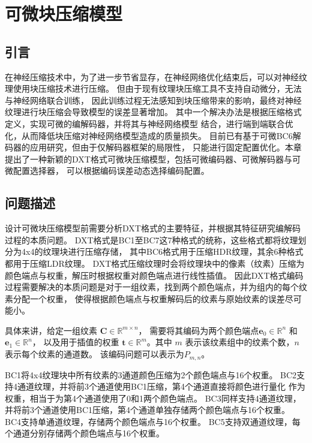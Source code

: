 
\chapter{可微块压缩模型}

\section{引言}

在神经压缩技术中，为了进一步节省显存，在神经网络优化结束后，可以对神经纹理使用块压缩技术进行压缩。
但由于现有纹理块压缩工具不支持自动微分，无法与神经网络联合训练，
因此训练过程无法感知到块压缩带来的影响，最终对神经纹理进行块压缩会导致模型的误差显著增加。
其中一个解决办法是根据压缩格式定义，实现可微的编解码器，并将其与神经网络模型
结合，进行端到端联合优化，从而降低块压缩对神经网络模型造成的质量损失。
目前已有基于可微BC6解码器的应用研究，但由于仅解码器框架的局限性，
只能进行固定配置优化。本章提出了一种新颖的DXT格式可微块压缩模型，包括可微编码器、可微解码器与可微配置选择器，
可以根据编码误差动态选择编码配置。

\section{问题描述}
\label{问题描述}

设计可微块压缩模型前需要分析DXT格式的主要特征，并根据其特征研究编解码过程的本质问题。
DXT格式是BC1至BC7这7种格式的统称，这些格式都将纹理划分为4x4的纹理块进行压缩存储，
其中BC6格式用于压缩HDR纹理，其余6种格式都用于压缩LDR纹理。
DXT格式压缩纹理时会将纹理块中的像素（纹素）压缩为颜色端点与权重，解压时根据权重对颜色端点进行线性插值。
因此DXT格式编码过程需要解决的本质问题是对于一组纹素，找到两个颜色端点，并为组内的每个纹素分配一个权重，
使得根据颜色端点与权重解码后的纹素与原始纹素的误差尽可能小。

具体来讲，给定一组纹素 $\mathbf{C}\in\mathbb{R}^{m\times n}$，
需要将其编码为两个颜色端点$\mathbf{e}_0\in\mathbb{R}^n$ 和 $\mathbf{e}_1\in\mathbb{R}^n$，
以及用于插值的权重 $\mathbf{t}\in\mathbb{R}^m$。其中 $m$ 表示该纹素组中的纹素个数，$n$ 表示每个纹素的通道数。
该编码问题可以表示为$P_{m,n}$。

BC1将4x4纹理块中所有纹素的3通道颜色压缩为2个颜色端点与16个权重。
BC2支持4通道纹理，并将前3个通道使用BC1压缩，第4个通道直接将颜色进行量化
作为权重，相当于为第4个通道使用了0和1两个颜色端点。
BC3同样支持4通道纹理，并将前3个通道使用BC1压缩，第4个通道单独存储两个颜色端点与16个权重。
BC4支持单通道纹理，存储两个颜色端点与16个权重。
BC5支持双通道纹理，每个通道分别存储两个颜色端点与16个权重。

